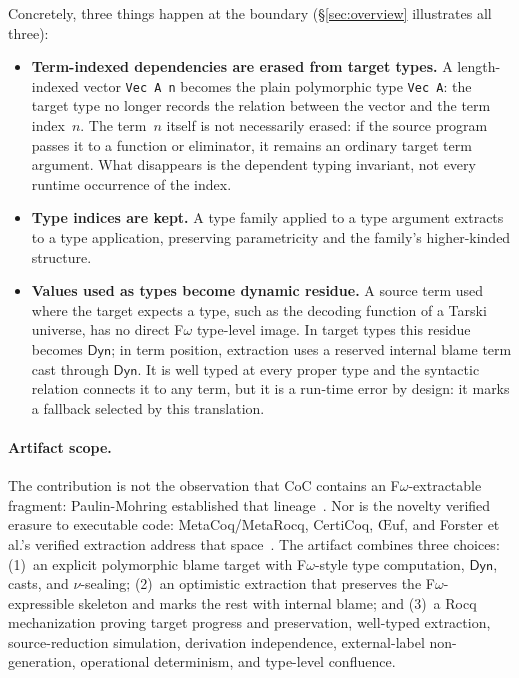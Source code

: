 \documentclass[acmsmall,anonymous=false,nonacm]{acmart}
\newcommand{\dyn}{\ensuremath{\mathsf{Dyn}}}
\begin{document}
Concretely, three things happen at the boundary (\S\ref{sec:overview}
illustrates all three):
\begin{itemize}
\item \textbf{Term-indexed dependencies are erased from target types.}
A length-indexed vector \texttt{Vec A n} becomes the plain polymorphic type
\texttt{Vec A}: the target type no longer records the relation between the
vector and the term index~$n$.  The term~$n$ itself is not necessarily erased:
if the source program passes it to a function or eliminator, it remains an
ordinary target term argument.  What disappears is the dependent typing
invariant, not every runtime occurrence of the index.
\item \textbf{Type indices are kept.} A type family applied to a type argument
extracts to a type application, preserving parametricity and the family's
higher-kinded structure.
\item \textbf{Values used as types become dynamic residue.}
A source term used where the target expects a type, such as the decoding
function of a Tarski universe, has no direct F$\omega$ type-level image.
In target types this residue becomes $\dyn$; in term position, extraction
uses a reserved internal blame term cast through $\dyn$. It is well typed at
every proper type and the syntactic relation connects it to any term, but it is
a run-time error by design: it marks a fallback selected by this translation.
\end{itemize}

\paragraph{Artifact scope.}
The contribution is not the observation that CoC contains an F$\omega$-extractable fragment:
Paulin-Mohring established that lineage~\cite{paulinmohring1989fomega}.  Nor is
the novelty verified erasure to executable code: MetaCoq/MetaRocq, CertiCoq,
\OE{}uf, and Forster et al.'s verified extraction address that
space~\cite{sozeau2020metacoq,anand2017certicoq,mullen2018oeuf,forster2024verified}.
The artifact combines three choices: (1)~an explicit polymorphic
blame target with F$\omega$-style type computation, $\dyn$, casts, and
$\nu$-sealing; (2)~an optimistic extraction that preserves the
F$\omega$-expressible skeleton and marks the rest with internal blame; and
(3)~a Rocq mechanization proving target progress and preservation, well-typed
extraction, source-reduction simulation, derivation independence,
external-label non-generation, operational determinism, and type-level
confluence.
\end{document}
